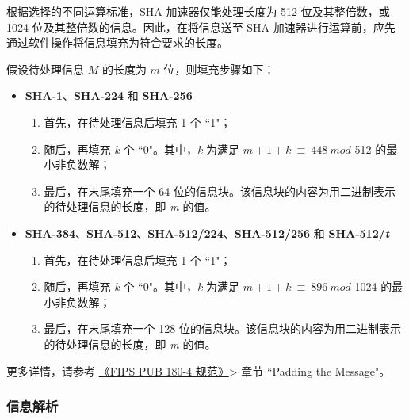 \documentclass[main\_\_CN.tex]{subfiles}
\begin{document}
根据选择的不同运算标准，SHA 加速器仅能处理长度为 512 位及其整倍数，或 1024 位及其整倍数的信息。因此，在将信息送至 SHA 加速器进行运算前，应先通过软件操作将信息填充为符合要求的长度。

假设待处理信息 \begin{math} M \end{math} 的长度为 \begin{math} m \end{math} 位，则填充步骤如下：

\begin{itemize}
    \item \textbf{SHA-1}、\textbf{SHA-224} 和 \textbf{SHA-256}
    \begin{enumerate}
        \item 首先，在待处理信息后填充 1 个 ``1"；
        \item 随后，再填充 {\it{k}} 个 ``0"。其中，{\it{k}} 为满足 \begin{math}m + 1 + k \ {\equiv} \ 448 \ mod \end{math} 512 的最小非负数解；
        \item 最后，在末尾填充一个 64 位的信息块。该信息块的内容为用二进制表示的待处理信息的长度，即 {\it{m}} 的值。
    \end{enumerate}
    \item \textbf{SHA-384}、\textbf{SHA-512}、\textbf{SHA-512/224}、\textbf{SHA-512/256} 和 \textbf{SHA-512/{\it{t}}}
    \begin{enumerate}
        \item 首先，在待处理信息后填充 1 个 ``1"；
        \item 随后，再填充 {\it{k}} 个 ``0"。其中，{\it{k}} 为满足 \begin{math}m + 1 + k \ {\equiv} \ 896 \ mod \end{math} 1024 的最小非负数解；
        \item 最后，在末尾填充一个 128 位的信息块。该信息块的内容为用二进制表示的待处理信息的长度，即 {\it{m}} 的值。
    \end{enumerate}
\end{itemize}

更多详情，请参考 \href{https://doi.org/10.6028/NIST.FIPS.180-4}{《FIPS PUB 180-4 规范》}> 章节 ``Padding the Message"。

\subsubsection{信息解析}\label{sec:sha-parsingmessage}
\end{document}
